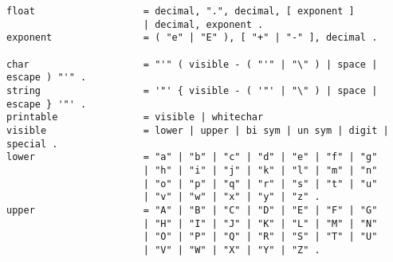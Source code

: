 \documentclass[a4paper, article, oneside, 10pt]{memoir}
\begin{document}
\begin{verbatim}
float                   = decimal, ".", decimal, [ exponent ]
                        | decimal, exponent .
exponent                = ( "e" | "E" ), [ "+" | "-" ], decimal .

char                    = "'" ( visible - ( "'" | "\" ) | space | escape ) "'" .
string                  = '"' { visible - ( '"' | "\" ) | space | escape } '"' .
printable               = visible | whitechar
visible                 = lower | upper | bi sym | un sym | digit | special .
lower                   = "a" | "b" | "c" | "d" | "e" | "f" | "g"
                        | "h" | "i" | "j" | "k" | "l" | "m" | "n"
                        | "o" | "p" | "q" | "r" | "s" | "t" | "u"
                        | "v" | "w" | "x" | "y" | "z" .
upper                   = "A" | "B" | "C" | "D" | "E" | "F" | "G"
                        | "H" | "I" | "J" | "K" | "L" | "M" | "N"
                        | "O" | "P" | "Q" | "R" | "S" | "T" | "U"
                        | "V" | "W" | "X" | "Y" | "Z" .
\end{verbatim}
\end{document}
